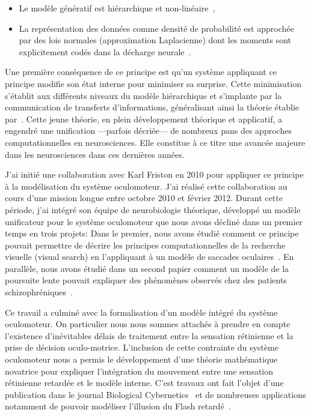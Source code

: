 \documentclass[11pt,french,a4paper,oneside]{article}%
\begin{document}
\begin{itemize}
\item Le modèle génératif est hiérarchique et non-linéaire~\citep{Friston08b},
\item La représentation des données comme densité de probabilité est approchée par des lois normales (approximation Laplacienne) dont les moments sont explicitement codés dans la décharge neurale~\citep{Friston09a}.
\end{itemize}
Une première conséquence de ce principe est qu'un système appliquant ce principe modifie son état interne pour minimiser sa surprise. Cette minimisation s'établit aux différents niveaux du modèle hiérarchique et s'implante par la communication de transferts d'informations, généralisant ainsi la théorie établie par~\citet{Mumford92}. Cette jeune théorie, en plein développement théorique et applicatif, a engendré une unification ---parfois décriée--- de nombreux pans des approches computationnelles en neurosciences. Elle constitue à ce titre une avancée majeure dans les neurosciences dans ces dernières années.

J'ai initié une collaboration avec Karl Friston en 2010 pour appliquer ce principe à la modélisation du système oculomoteur. J'ai réalisé cette collaboration au cours d'une mission longue entre octobre 2010 et février 2012. Durant cette période, j'ai intégré son équipe de neurobiologie théorique, développé un modèle unificateur pour le système oculomoteur que nous avons décliné dans un premier temps en trois projets: Dans le premier, nous avons étudié comment ce principe pouvait permettre de décrire les principes computationnelles de la recherche visuelle (visual search) en l'appliquant à un modèle de saccades oculaires~\citep{Friston12}. En parallèle, nous avons étudié dans un second papier comment un modèle de la poursuite lente pouvait expliquer des phénomènes observés chez des patients schizophréniques~\citep{Adams12}. 

Ce travail a culminé avec la formalisation d'un modèle intégré du système oculomoteur. On particulier nous nous sommes attachés à prendre en compte l'existence d'inévitables délais de traitement entre la sensation rétinienne et la prise de décision oculo-motrice. L'inclusion de cette contrainte du système oculomoteur nous a permis le développement d'une théorie mathématique novatrice pour expliquer l'intégration du mouvement entre une sensation rétinienne retardée et le modèle interne. C'est travaux ont fait l'objet d'une publication dans le journal Biological Cybernetics~\citep{PerrinetAdamsFriston14} et de nombreuses applications notamment de pouvoir modéliser l'illusion du Flash retardé~\citep{KhoeiMassonPerrinet17}.
\end{document}
